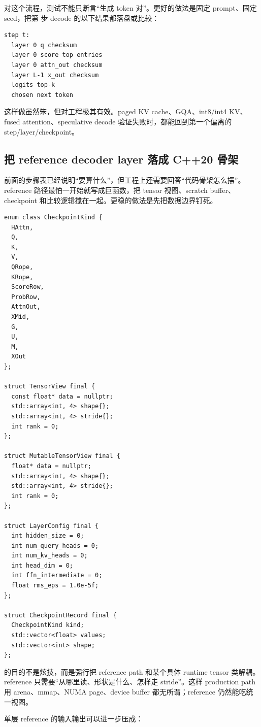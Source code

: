 对这个流程，测试不能只断言“生成 token 对”。更好的做法是固定 prompt、固定 seed，把第  步 decode 的以下结果都落盘或比较：

\begin{lstlisting}[numbers=none,caption={decode oracle 的逐步证据}]
step t:
  layer 0 q checksum
  layer 0 score top entries
  layer 0 attn_out checksum
  layer L-1 x_out checksum
  logits top-k
  chosen next token
\end{lstlisting}

这样做虽然笨，但对工程极其有效。paged KV cache、GQA、int8/int4 KV、fused attention、speculative decode 验证失败时，都能回到第一个偏离的 step/layer/checkpoint。

\subsection{把 reference decoder layer 落成 C++20 骨架}

前面的步骤表已经说明“要算什么”，但工程上还需要回答“代码骨架怎么摆”。reference 路径最怕一开始就写成巨函数，把 tensor 视图、scratch buffer、checkpoint 和比较逻辑搅在一起。更稳的做法是先把数据边界钉死。

\begin{lstlisting}[numbers=none,caption={reference path 的最小数据结构骨架}]
enum class CheckpointKind {
  HAttn,
  Q,
  K,
  V,
  QRope,
  KRope,
  ScoreRow,
  ProbRow,
  AttnOut,
  XMid,
  G,
  U,
  M,
  XOut
};

struct TensorView final {
  const float* data = nullptr;
  std::array<int, 4> shape{};
  std::array<int, 4> stride{};
  int rank = 0;
};

struct MutableTensorView final {
  float* data = nullptr;
  std::array<int, 4> shape{};
  std::array<int, 4> stride{};
  int rank = 0;
};

struct LayerConfig final {
  int hidden_size = 0;
  int num_query_heads = 0;
  int num_kv_heads = 0;
  int head_dim = 0;
  int ffn_intermediate = 0;
  float rms_eps = 1.0e-5f;
};

struct CheckpointRecord final {
  CheckpointKind kind;
  std::vector<float> values;
  std::vector<int> shape;
};
\end{lstlisting}

 的目的不是炫技，而是强行把 reference path 和某个具体 runtime tensor 类解耦。reference 只需要“从哪里读、形状是什么、怎样走 stride”。这样 production path 用 arena、mmap、NUMA page、device buffer 都无所谓；reference 仍然能吃统一视图。

单层 reference 的输入输出可以进一步压成：

